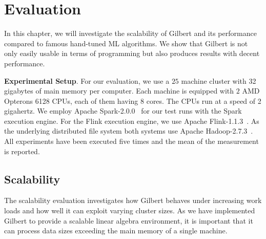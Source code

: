 \section{Evaluation}
\label{sec:evaluation}

In this chapter, we will investigate the scalability of Gilbert and its performance compared to famous hand-tuned ML algorithms.
We show that Gilbert is not only easily usable in terms of programming but also produces results with decent performance.

\textbf{Experimental Setup}. For our evaluation, we use a $25$ machine cluster with 32 gigabytes of main memory per computer.
Each machine is equipped with $2$ AMD Opterons 6128 CPUs, each of them having $8$ cores.
The CPUs run at a speed of 2 gigahertz. We employ Apache Spark-2.0.0~\cite{spark} for our test runs with the Spark execution engine.
For the Flink execution engine, we use Apache Flink-1.1.3~\cite{flink}. As the underlying distributed file system both systems use Apache Hadoop-2.7.3~\cite{hadoop:2008a}. All experiments have been executed five times and the mean of the measurement is reported.

\subsection{Scalability}

The scalability evaluation investigates how Gilbert behaves under increasing work loads and how well it can exploit varying cluster sizes.
As we have implemented Gilbert to provide a scalable linear algebra environment, it is important that it can process data sizes exceeding the main memory of a single machine.


